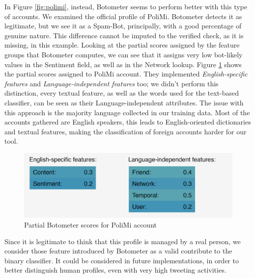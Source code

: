 In Figure \ref{fig:polimi}, instead, Botometer seems to perform better with this type of accounts. We examined the official profile of PoliMi. Botometer detects it as legitimate, but we see it as a Spam-Bot, principally, with a good percentage of genuine nature. This difference cannot be imputed to the verified check, as it is missing, in this example.
Looking at the partial scores assigned by the feature groups that Botometer computes, we can see that it assigns very low bot-likely values in the Sentiment field, as well as in the Network lookup. Figure \ref{fig:polimi_details} shows the partial scores assigned to PoliMi account. They implemented \textit{English-specific features} and \textit{Language-independent features} too; we didn't perform this distinction, every textual feature, as well as the words used for the text-based classifier, can be seen as their Language-independent attributes. The issue with this approach is the majority language collected in our training data. Most of the accounts gathered are English speakers, this leads to English-oriented dictionaries and textual features, making the classification of foreign accounts harder for our tool.
\begin{figure}[htp!]
	\begin{center}
		\includegraphics[width=0.8\columnwidth]{chapter7/figure/polimi_details.png}\par
	\end{center}
	\caption{Partial Botometer scores for PoliMi account}
	\label{fig:polimi_details}
\end{figure}

Since it is legitimate to think that this profile is managed by a real person, we consider those feature introduced by Botometer as a valid contribute to the binary classifier. It could be considered in future implementations, in order to better distinguish human profiles, even with very high tweeting activities.

